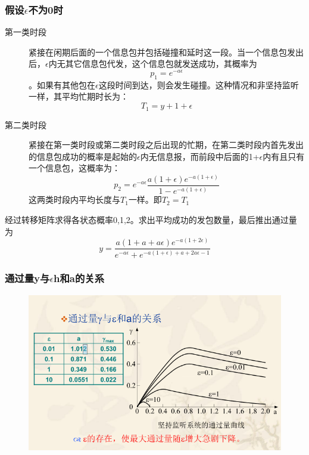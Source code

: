\subsubsection{假设$ \epsilon $不为0时}
\begin{description}
	\item[第一类时段] 紧接在闲期后面的一个信息包并包括碰撞和延时这一段。当一个信息包发出后，$ \epsilon $内无其它信息包代发，这个信息包就发送成功，其概率为 \begin{equation}\label{key}
	 p_1 = e^{-a\epsilon}
	\end{equation}。如果有其他包在$ \epsilon $这段时间到达，则会发生碰撞。这种情况和非坚持监听一样，其平均忙期时长为：
	\begin{equation}\label{key}
	T_1 = y+1+\epsilon
	\end{equation}
	\item [第二类时段] 紧接在第一类时段或第二类时段之后出现的忙期，在第二类时段内首先发出的信息包成功的概率是起始的$ \epsilon $内无信息报，而前段中后面的1+$ \epsilon $内有且只有一个信息包，这概率为：
	\begin{equation}\label{key}
	p_2 = e^{-a\epsilon}\frac{a(1+\epsilon)e^{-a(1+\epsilon)}}{1-e^{-a(1+\epsilon)}}
	\end{equation}
	这两类时段内平均长度与$ T_1 $一样。即$ T_2 = T_1 $
\end{description}
经过转移矩阵求得各状态概率0,1,2。求出平均成功的发包数量，最后推出通过量为
\begin{equation}\label{key}
y = \frac{a(1+a+a\epsilon)e^{-a(1+2\epsilon)}}{e^{-a\epsilon}+e^{-a(1+\epsilon)+a+2a\epsilon-1}}
\end{equation}
\subsubsection{通过量y与$ \epsilon $h和a的关系}
\begin{figure}[H]
	\centering
	\includegraphics[width=0.7\linewidth]{screenshot001}
	\caption{}
	\label{fig:screenshot001}
\end{figure}
